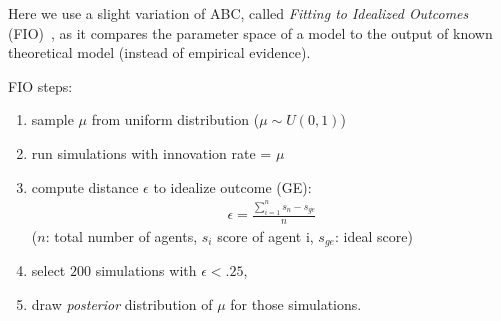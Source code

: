\documentclass[a1paper,fontscale=.47]{baposter}
\newcommand{\compresslist}{
	\setlength{\itemsep}{1pt}
	\setlength{\parskip}{0pt}
	\setlength{\parsep}{0pt}
}
\begin{document}
\begin{poster}
{Here we use a slight variation of ABC, called \emph{Fitting to Idealized Outcomes} (FIO)~\cite{gallagher2015transitiontofarmingmorelikelyforsmallconservativegroupswithpropertyrightsbutincreasedproductivityisnotessential}, as it compares the parameter space of a model to the output of known theoretical model (instead of empirical evidence).  

\vspace{.2cm}
{
	\footnotesize 
	FIO steps:
\vspace{-.3cm}
\setlength{\columnsep}{1mm}
	\begin{multicols*}{2}
	    \begin{enumerate}
		    \compresslist
		\item sample $\mu$ from uniform distribution ($\mu \sim U(0,1)$)
		\item run simulations with innovation rate = $\mu$ 
		\item compute distance $\epsilon$ to idealize outcome (GE):  
		    \begin{align*}
			\epsilon = \frac{ \sum_{i=1}^{n} s_n-s_{ge} }{n}   
		    \end{align*}
		    {\tiny ($n$: total number of agents, $s_i$ score of agent i, $s_{ge}$: ideal score)}
		    \vfill
		    \columnbreak
		\item select $200$ simulations with $\epsilon<.25$, 
		\item draw \emph{posterior} distribution of $\mu$ for those simulations.
	    \end{enumerate}
	\end{multicols*}
 }

 }




\end{poster}
\end{document}
